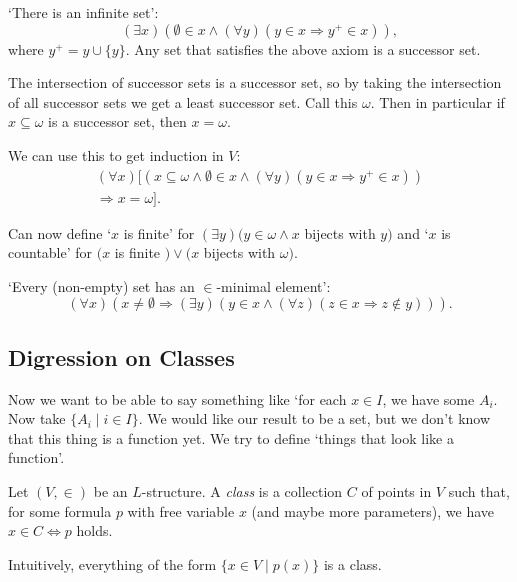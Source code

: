 \documentclass[a3paper, 10pt]{article}
\renewcommand{\vocab}[1]{\emph{#1}}
\begin{document}
\begin{multicols*}{5}
\begin{axiom}
`There is an infinite set':
$$
(\exists x)(\emptyset \in x \land (\forall y)(y \in x \Rightarrow y^+ \in x)),
$$
where $y^+ = y \cup \{y\}$. Any set that satisfies the above axiom is a successor set.
\end{axiom}

The intersection of successor sets is a successor set, so by taking the intersection of all successor sets we get a least successor set. Call this $\omega$. Then in particular if $x \subseteq \omega$ is a successor set, then $x = \omega$.

We can use this to get induction in $V$:
\begin{align*}
(\forall x)[(x \subseteq \omega \land \emptyset \in x\land
 (\forall y)(y \in x \Rightarrow y^+ \in x))\\
 \Rightarrow x= \omega].
\end{align*}


Can now define `$x$ is finite' for $(\exists y)(y \in \omega \land x$ bijects with $y)$ and `$x$ is countable' for $(x$ is finite $) \lor(x$ bijects with $\omega)$.

\begin{axiom}
  `Every (non-empty) set has an $\in$-minimal element':
  $$
  (\forall x)(x \neq \emptyset \Rightarrow(\exists y)(y \in x \land(\forall z)(z \in x \Rightarrow z \notin y))) .
  $$
\end{axiom}

\subsection{Digression on Classes}

Now we want to be able to say something like `for each $x \in I$, we have some $A_i$. Now take $\{A_i \mid i \in I\}$. We would like our result to be a set, but we don't know that this thing is a function yet. We try to define `things that look like a function'.

\begin{definition}[Class]
  Let $(V, \in)$ be an $L$-structure. A \vocab{class} is a collection $C$ of points in $V$ such that, for some formula $p$ with free variable $x$ (and maybe more parameters), we have $x \in C \Leftrightarrow p$ holds. 
\end{definition}
Intuitively, everything of the form $\{x \in V \mid p(x)\}$ is a class.


\end{multicols*}
\end{document}
